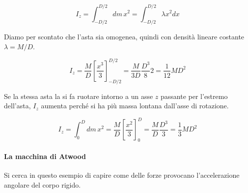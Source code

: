 \[
	I_z = \int_{-D/2}^{D/2} dm\,x^2 = \int_{-D/2}^{D/2} \lambda x^2 dx
\]

Diamo per scontato che l'asta sia omogenea, quindi con densità lineare costante $\lambda=M/D$.

\[
	I_z = \frac{M}{D} \left[ \frac{x^3 }{3} \right]_{-D/2}^{D/2} = \frac{M}{3D}\frac{D^3 }{8}2 = \frac{1}{12}MD^2
\]

Se la stessa asta la si fa ruotare intorno a un asse $z$ passante per l'estremo dell'asta, $I_z$ aumenta perché si ha più massa lontana dall'asse di rotazione.

\[
	I_z = \int_0^D dm\,x^2 = \frac{M}{D}\left[ \frac{x^2 }{3} \right]_0^D = \frac{M}{D}\frac{D^3 }{3}= \frac{1}{3} MD^2
\]

\paragraph{La macchina di Atwood} Si cerca in questo esempio di capire come delle forze provocano l'accelerazione angolare del corpo rigido.

